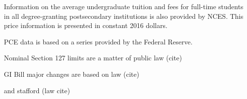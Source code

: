 \documentclass[review]{elsarticle}
\begin{document}


    Information on the average undergraduate tuition and fees for full-time students in all degree-granting postsecondary institutions
    is also provided by NCES\cite{nces_2017}.
    This price information is presented in constant 2016 dollars.

    PCE data is based on a series provided by the Federal Reserve.


    Nominal Section 127 limits are a matter of public law (cite)

    GI Bill major changes are based on law (cite)


    and stafford (law cite)
    
\end{document}
